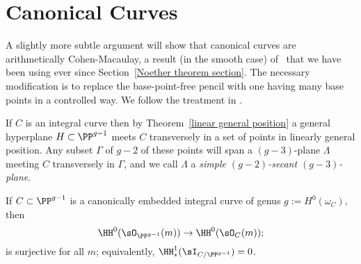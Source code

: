 \section{Canonical Curves}\label{canonical ACM}
A slightly more subtle argument will show that
canonical curves are arithmetically Cohen-Macaulay, a result (in the smooth case) of~\cite{Noether-canonical} that we have been using ever since Section~\ref{Noether theorem section}.
The necessary modification is to replace the base-point-free pencil with one having many base points in a controlled way.
We follow the treatment in \cite{Schreyer}. 

If $C$ is an integral curve then by Theorem~\ref{linear general position} a general hyperplane $H\subset \PP^{g-1}$
meets $C$ transversely in a set of points in linearly general position. Any subset $\Gamma$ of $g-2$ of these points will span a $(g-3)$-plane $\Lambda$
meeting $C$ transversely in $\Gamma$, and we call $\Lambda$ a \emph{simple $(g-2)$-secant $(g-3)$-plane}. 

\begin{theorem}\label{canonical curves are ACM}
If $C\subset \PP^{g-1}$ is a  canonically embedded integral curve of genus $g := H^0(\omega_C)$, then 
$$
\HH^{0}(\sO_{\PP^{g-1}}(m)) \to \HH^{0}(\sO_{C}(m));
$$
is  surjective for all $m$; equivalently,
$\HH^{1}_*(\sI_{C/\PP^{g-1}}) = 0$.
\end{theorem}
  
